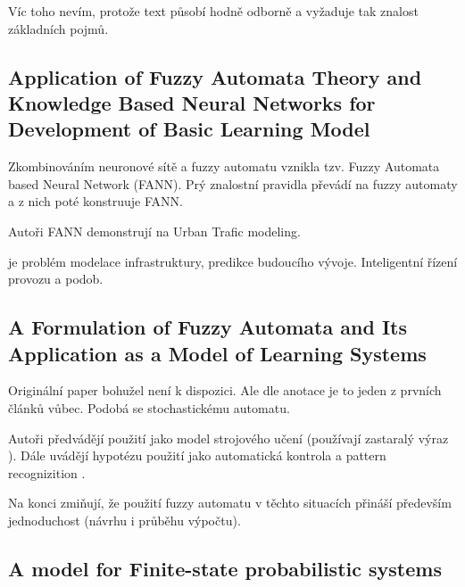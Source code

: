 \documentclass[a4paper,10pt]{article}
\begin{document}
Víc toho nevím, protože text působí hodně odborně a vyžaduje tak znalost základních pojmů.

\subsection{Application of Fuzzy Automata Theory and Knowledge Based Neural Networks for Development of Basic Learning Model \cite{DarAhmSin-AppFuzzAutTheKnBsNeuNetDevBasLeaMod}}

Zkombinováním neuronové sítě a fuzzy automatu vznikla tzv. Fuzzy  Automata  based  Neural  Network (FANN). Prý znalostní pravidla převádí na fuzzy automaty a z nich poté konstruuje FANN.

\begin{definition}
\end{definition}


Autoři FANN demonstrují na Urban Trafic modeling.

\begin{definition}
 je problém modelace infrastruktury, predikce budoucího vývoje. Inteligentní řízení provozu a podob.
\end{definition}

\subsection{A Formulation of Fuzzy Automata and Its Application as a Model of Learning Systems \cite{WeeFu-FormFuzzzAutItsAppModLearSyss}}

Originální paper bohužel není k dispozici. Ale dle anotace je to jeden z prvních článků vůbec. Podobá se stochastickému automatu.

\begin{definition}
\end{definition}

Autoři předvádějí použití  jako model strojového učení (používají zastaralý výraz ). Dále uvádějí hypotézu použití jako automatická kontrola a pattern recognizition .

Na konci zmiňují, že použití fuzzy automatu v těchto situacích přináší především jednoduchost (návrhu i průběhu výpočtu).


\subsection{A model for Finite-state probabilistic systems \cite{BruFu-ModelFinStateProbSyss}}
\end{document}
